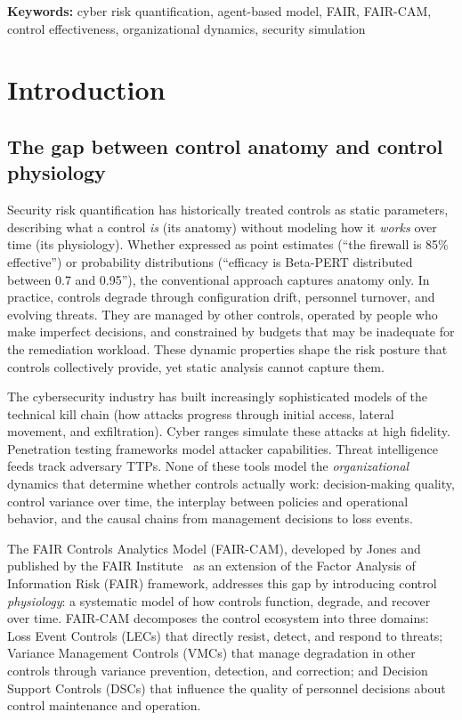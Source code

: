 \documentclass[11pt,a4paper]{article}
\begin{document}
\medskip
\noindent\textbf{Keywords:} cyber risk quantification, agent-based model, FAIR, FAIR-CAM, control effectiveness, organizational dynamics, security simulation

\section{Introduction}

\subsection{The gap between control anatomy and control physiology}

Security risk quantification has historically treated controls as static parameters, describing what a control \emph{is} (its anatomy) without modeling how it \emph{works} over time (its physiology). Whether expressed as point estimates (``the firewall is 85\% effective'') or probability distributions (``efficacy is Beta-PERT distributed between 0.7 and 0.95''), the conventional approach captures anatomy only. In practice, controls degrade through configuration drift, personnel turnover, and evolving threats. They are managed by other controls, operated by people who make imperfect decisions, and constrained by budgets that may be inadequate for the remediation workload. These dynamic properties shape the risk posture that controls collectively provide, yet static analysis cannot capture them.

The cybersecurity industry has built increasingly sophisticated models of the technical kill chain (how attacks progress through initial access, lateral movement, and exfiltration). Cyber ranges simulate these attacks at high fidelity. Penetration testing frameworks model attacker capabilities. Threat intelligence feeds track adversary TTPs. None of these tools model the \emph{organizational} dynamics that determine whether controls actually work: decision-making quality, control variance over time, the interplay between policies and operational behavior, and the causal chains from management decisions to loss events.

The FAIR Controls Analytics Model (FAIR-CAM), developed by Jones and published by the FAIR Institute~\citep{Jones2023FAIRCAM} as an extension of the Factor Analysis of Information Risk (FAIR) framework, addresses this gap by introducing control \emph{physiology}: a systematic model of how controls function, degrade, and recover over time. FAIR-CAM decomposes the control ecosystem into three domains: Loss Event Controls (LECs) that directly resist, detect, and respond to threats; Variance Management Controls (VMCs) that manage degradation in other controls through variance prevention, detection, and correction; and Decision Support Controls (DSCs) that influence the quality of personnel decisions about control maintenance and operation.
\end{document}
